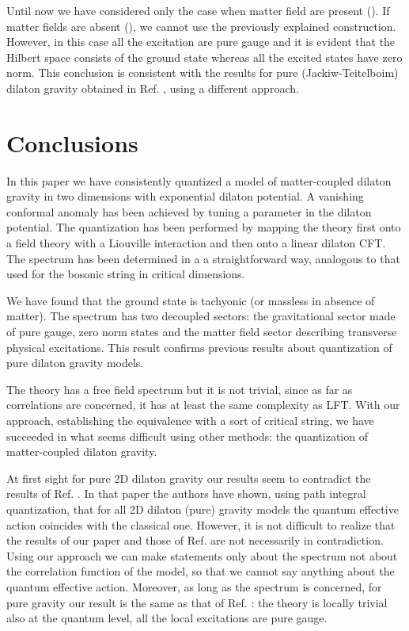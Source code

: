 \documentclass[a4paper,aps,prd,twocolumn,groupedaddress]{revtex4}
\begin{document}
Until now we have considered only the case when matter field are
present (\coordHE{}).  If matter fields are absent (\coordHE{}), we cannot use
the previously explained construction.  However, in this case all the
excitation are pure gauge and it is evident that the Hilbert space
consists of the ground state whereas all the excited states have zero
norm.  This conclusion is consistent with the results for pure
(Jackiw-Teitelboim) dilaton gravity obtained in Ref. \cite{jack}, using
a different approach.


\section{Conclusions}
In this paper we have consistently quantized a model of matter-coupled
dilaton gravity in two dimensions with exponential dilaton potential.
A vanishing conformal anomaly has been achieved by tuning a parameter
in the dilaton potential. The quantization has been performed by
mapping the theory first onto a field theory with a Liouville interaction
and then onto a linear dilaton CFT.  The spectrum has been determined
in a a straightforward way, analogous to that used for the bosonic
string in critical dimensions.

We have found that the ground state is tachyonic (or massless in
absence of matter). The spectrum has two decoupled sectors: the
gravitational sector made of pure gauge, zero norm states and the
matter field sector describing transverse physical excitations.  This
result confirms previous results \cite{jack} about quantization of
pure dilaton gravity models. 

The theory has a free field spectrum but it is not trivial, since as
far as correlations are concerned, it has at least the same complexity
as LFT. With our approach, establishing the equivalence with a sort of
critical string, we have  succeeded in what seems difficult
using other methods: the quantization of matter-coupled dilaton
gravity.

At first sight for pure 2D dilaton gravity 
our results seem to contradict the results of Ref. 
\cite{klw}. In that paper the authors have shown, using path integral 
quantization, that for all 2D dilaton (pure) gravity models the quantum 
effective action coincides with the classical one. 
However, it is not difficult to realize that the results of our paper 
and those of Ref. \cite{klw} are not necessarily in contradiction.
Using our approach we can make statements only about  the
spectrum not about the correlation function of the model, so that
we cannot say anything about 
the quantum effective action. 
Moreover, as  long as the spectrum is concerned, for pure gravity
our result is the same as that of Ref. \cite{klw}: the theory is 
locally trivial also at the quantum level, all the local excitations  
are pure gauge.
\end{document}

